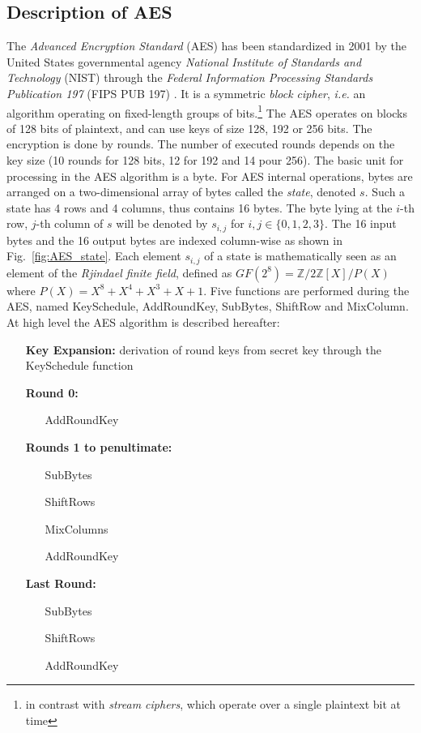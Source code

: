 \subsection{Description of AES}
The \emph{Advanced Encryption Standard} (AES) has been standardized in 2001 by the United States governmental agency \emph{National Institute of Standards and Technology} (NIST) through the \emph{Federal Information
Processing Standards Publication 197 } (FIPS PUB 197) \cite{nist197}. It is a symmetric \emph{block cipher}, \emph{i.e.} an algorithm operating on fixed-length groups of bits.\footnote{in contrast with \emph{stream ciphers}, which operate over a single plaintext bit at time} The AES operates on blocks of 128 bits of plaintext, and can use keys of size 128, 192 or 256 bits. The encryption is done by rounds. The number of executed rounds depends on the key size (10 rounds for 128 bits, 12 for 192 and 14 pour 256). The basic unit for processing in the AES algorithm is a byte. For AES internal operations, bytes are arranged on a two-dimensional array of bytes called the \emph{state}, denoted $s$. Such a state has 4 rows and 4 columns, thus contains 16 bytes. The byte lying at the $i$-th row, $j$-th column of $s$ will be denoted by $s_{i,j}$ for $i,j\in\{0,1,2,3\}$. The 16 input bytes and the 16 output bytes are indexed column-wise as shown in Fig.~\ref{fig:AES_state}. Each element $s_{i,j}$ of a state is mathematically seen as an element of the \emph{Rjindael finite field}, defined as $GF(2^8) = \mathbb{Z}/{2\mathbb{Z}[X]}/P(X)$ where $P(X) = X^8 + X^4 + X^3 + X + 1$. Five functions are performed during the AES, named KeySchedule, AddRoundKey, SubBytes, ShiftRow and MixColumn. At high level the AES algorithm is described hereafter:
\begin{itemize}
\item[\textbf{Key Expansion:}]  derivation of round keys from secret key through the KeySchedule function
\item[\textbf{Round 0:} ] 
\begin{itemize}
\item[] AddRoundKey
\end{itemize}
\item[\textbf{Rounds 1 to penultimate:}] 
\begin{itemize}
\item[] SubBytes
\item[] ShiftRows
\item[] MixColumns
\item[] AddRoundKey
\end{itemize}
\item[\textbf{Last Round:}] 
\begin{itemize}
\item[] SubBytes
\item[] ShiftRows
\item[] AddRoundKey
\end{itemize}
\end{itemize}

